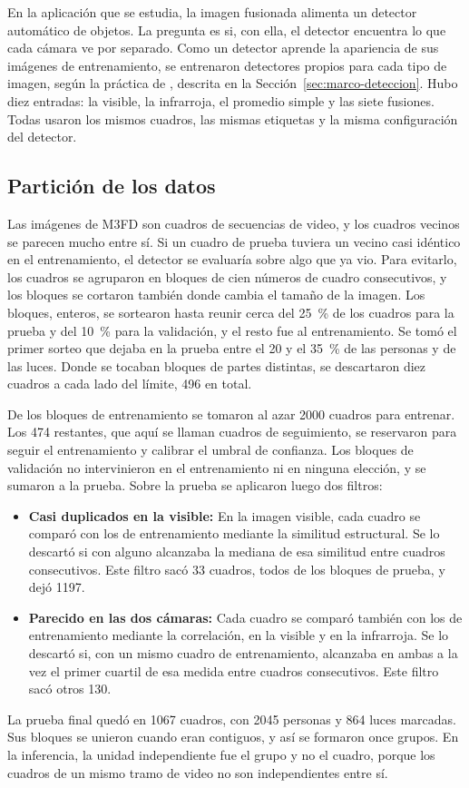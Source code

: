 En la aplicación que se estudia, la imagen fusionada alimenta un detector automático de objetos. La
pregunta es si, con ella, el detector encuentra lo que cada cámara ve por separado. Como un detector
aprende la apariencia de sus imágenes de entrenamiento, se entrenaron detectores propios para cada tipo
de imagen, según la práctica de \textcite{liu2022}, descrita en la Sección~\ref{sec:marco-deteccion}. Hubo diez
entradas: la visible, la infrarroja, el promedio simple y las siete fusiones. Todas usaron los mismos cuadros, las mismas
etiquetas y la misma configuración del detector.

\subsection{Partición de los datos}
\label{sec:det-datos}

Las imágenes de M3FD son cuadros de secuencias de video, y los cuadros vecinos se parecen mucho entre
sí. Si un cuadro de prueba tuviera un vecino casi idéntico en el entrenamiento, el detector se evaluaría
sobre algo que ya vio. Para evitarlo, los cuadros se agruparon en bloques de cien números de cuadro
consecutivos, y los bloques se cortaron también donde cambia el tamaño de la imagen. Los bloques,
enteros, se sortearon hasta reunir cerca del 25~\% de los cuadros para la prueba y del 10~\% para la
validación, y el resto fue al entrenamiento. Se tomó el primer sorteo que dejaba en la prueba entre el
20 y el 35~\% de las personas y de las luces. Donde se tocaban bloques de partes distintas, se
descartaron diez cuadros a cada lado del límite, 496 en total.

De los bloques de entrenamiento se tomaron al azar 2000 cuadros para entrenar. Los 474 restantes, que
aquí se llaman cuadros de seguimiento, se reservaron para seguir el entrenamiento y calibrar el umbral
de confianza. Los bloques de validación no intervinieron en el entrenamiento ni en ninguna elección, y
se sumaron a la prueba. Sobre la prueba se aplicaron luego dos filtros:
\begin{itemize}
\item \textbf{Casi duplicados en la visible:} En la imagen visible, cada cuadro se comparó con los de
entrenamiento mediante la similitud estructural. Se lo descartó si con alguno alcanzaba la mediana de
esa similitud entre cuadros consecutivos. Este filtro sacó 33 cuadros, todos de los bloques de prueba, y
dejó 1197.
\item \textbf{Parecido en las dos cámaras:} Cada cuadro se comparó también con los de entrenamiento
mediante la correlación, en la visible y en la infrarroja. Se lo descartó si, con un mismo cuadro de
entrenamiento, alcanzaba en ambas a la vez el primer cuartil de esa medida entre cuadros
consecutivos. Este filtro sacó otros 130.
\end{itemize}
La prueba final quedó en 1067 cuadros, con 2045 personas y 864 luces marcadas. Sus bloques se unieron
cuando eran contiguos, y así se formaron once grupos. En la inferencia, la unidad independiente fue el
grupo y no el cuadro, porque los cuadros de un mismo tramo de video no son independientes entre sí.

